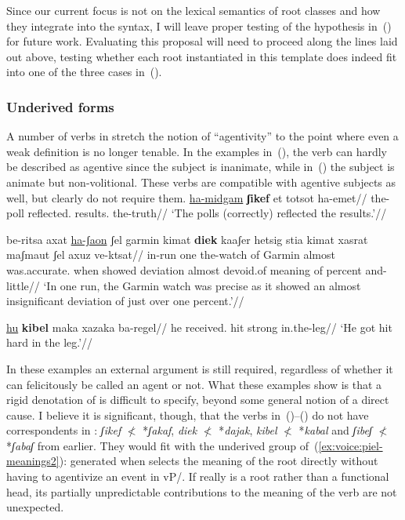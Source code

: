 {Since our current focus is not on the lexical semantics of root classes and how they integrate into the syntax, I will leave proper testing of the hypothesis in~(\lastx) for future work. Evaluating this proposal will need to proceed along the lines laid out above, testing whether each root instantiated in this template does indeed fit into one of the three cases in~(\lastx).

		\subsubsection{Underived forms} \label{voice:va:sem:underived}
A number of verbs in {\tpie} stretch the notion of ``agentivity'' to the point where even a weak definition is no longer tenable. In the examples in~(\nextx), the verb can hardly be described as agentive since the subject is inanimate, while in~(\anextx) the subject is animate but non-volitional. These verbs are compatible with agentive subjects as well, but clearly do not require them.
\pex
  \a \begingl
    \gla \underline{ha-midgam} \textbf{ʃikef} et totsot ha-emet//
    \glb the-poll reflected.  results. the-truth//
    \glft `The polls (correctly) reflected the results.'//
  \endgl
    
  \a \begingl
    \gla be-ritsa axat \underline{ha-ʃaon} ʃel garmin kimat \textbf{diek} kaaʃer hetsig stia kimat xasrat maʃmaut ʃel axuz ve-ktsat//
    \glb in-run one the-watch of Garmin almost was.accurate. when showed deviation almost devoid.of meaning of percent and-little//
    \glft `In one run, the Garmin watch was precise as it showed an almost insignificant deviation of just over one percent.'//
  \endgl
\xe

\ex \begingl
  \gla \underline{hu} \textbf{kibel} maka xazaka ba-regel//
  \glb he received. hit strong in.the-leg//
  \glft `He got hit hard in the leg.'//
  \endgl
\xe

In these examples an external argument is still required, regardless of whether it can felicitously be called an agent or not. What these examples show is that a rigid denotation of {\va} is difficult to specify, beyond some general notion of a direct cause. I believe it is significant, though, that the verbs in~(\blastx)--(\lastx) do not have correspondents in {\tkal}: \emph{ʃikef} $\nless$ *\emph{ʃakaf}, \emph{diek} $\nless$ *\emph{dajak}, \emph{kibel} $\nless$ *\emph{kabal} and \emph{ʃibeʃ} $\nless$ *\emph{ʃabaʃ} from earlier. They would fit with the underived group of~(\ref{ex:voice:piel-meanings2}): generated when {\va} selects the meaning of the root directly without having to agentivize an event in vP/{\tkal}. If {\va} really is a root rather than a functional head, its partially unpredictable contributions to the meaning of the verb are not unexpected.

}
